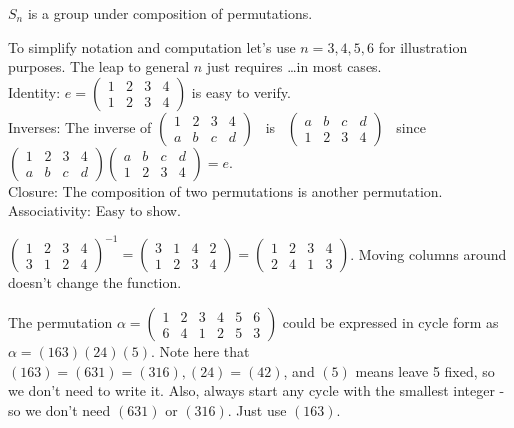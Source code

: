 \documentclass[12pt]{book}
\theoremstyle{definition}
\begin{document}
\begin{tctheorem}{}{}
$ S_n $ is a group under composition of permutations.
\end{tctheorem}
\begin{newproof}
To simplify notation and computation let's use $ n=3,4,5,6 $ for illustration purposes. The leap to general $ n $ just requires \dots in most cases.\\
Identity: $ e=\begin{pmatrix} 
1 & 2 & 3 &  4\\
1 & 2 & 3 & 4
\end{pmatrix} $ is easy to verify.\\
Inverses: The inverse of $ \begin{pmatrix} 
1 & 2 & 3 &  4\\
a & b & c & d
\end{pmatrix} $ ~is~ $ \begin{pmatrix} 
a & b & c &  d\\
1 & 2 & 3 & 4
\end{pmatrix} $ ~since~ $\begin{pmatrix} 
1 & 2 & 3 &  4\\
a & b & c & d
\end{pmatrix}\begin{pmatrix} 
a& b & c &  d\\
1 & 2 & 3 & 4
\end{pmatrix}=e$.\\
Closure: The composition of two permutations is another permutation.\\
Associativity: Easy to show.
\end{newproof}

\begin{tcexample}{}{}
 $ \begin{pmatrix} 
1 & 2 & 3 &  4\\
3 & 1 & 2 & 4
\end{pmatrix}^{-1}=\begin{pmatrix} 
3 & 1 & 4 &  2\\
1 & 2 & 3 & 4
\end{pmatrix}=\begin{pmatrix} 
1 & 2 & 3 &  4\\
2 & 4 & 1 & 3
\end{pmatrix} $. Moving columns around doesn't change the function.
\end{tcexample}

\begin{tcexample}{}{}
The permutation $ \alpha= \begin{pmatrix} 
1 & 2 & 3 &  4 & 5 & 6\\
6 & 4 & 1 & 2 & 5 & 3
\end{pmatrix} $ could be expressed in cycle form as $ \alpha=(163)(24)(5) $. Note here that $ (163)=(631)=(316),(24)=(42) $, and $ (5) $ means leave 5 fixed, so we don't need to write it. Also, always start any cycle with the smallest integer - so we don't need $ (631) $ or $ (316) $. Just use $ (163) $.
\end{tcexample}
\end{document}
